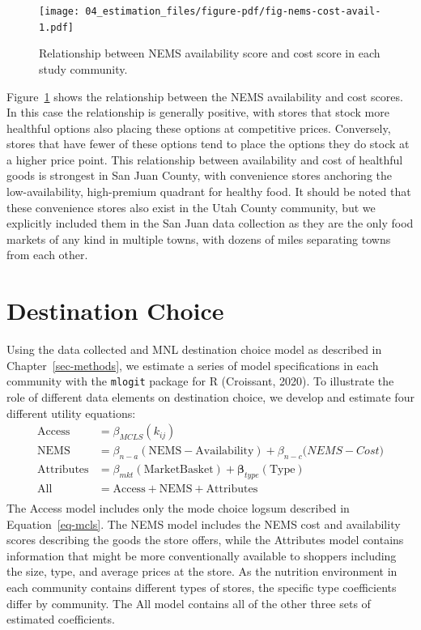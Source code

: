 \documentclass[
  letterpaper,
  DIV=11,
  numbers=noendperiod]{scrreport}
\begin{document}
\begin{figure}[t]

{\centering \texttt{[image: 04\_estimation\_files/figure-pdf/fig-nems-cost-avail-1.pdf]}

}

\caption{\label{fig-nems-cost-avail}Relationship between NEMS
availability score and cost score in each study community.}

\end{figure}

Figure~\ref{fig-nems-cost-avail} shows the relationship between the NEMS
availability and cost scores. In this case the relationship is generally
positive, with stores that stock more healthful options also placing
these options at competitive prices. Conversely, stores that have fewer
of these options tend to place the options they do stock at a higher
price point. This relationship between availability and cost of
healthful goods is strongest in San Juan County, with convenience stores
anchoring the low-availability, high-premium quadrant for healthy food.
It should be noted that these convenience stores also exist in the Utah
County community, but we explicitly included them in the San Juan data
collection as they are the only food markets of any kind in multiple
towns, with dozens of miles separating towns from each other.

\hypertarget{sec-estimation}{%
\section{Destination Choice}\label{sec-estimation}}

Using the data collected and MNL destination choice model as described
in Chapter~\ref{sec-methods}, we estimate a series of model
specifications in each community with the \texttt{mlogit} package for R
(Croissant, 2020). To illustrate the role of different data elements on
destination choice, we develop and estimate four different utility
equations: \begin{align*}
\mathrm{Access} &= \beta_{MCLS}( k_{ij})\\
\mathrm{NEMS} &= \beta_{n-a} (\mathrm{NEMS-Availability}) + \beta_{n-c}\mathrm({NEMS-Cost})\\
\mathrm{Attributes} &= \beta_{mkt} (\mathrm{Market Basket}) + \mathbf{\beta}_{type}(\mathrm{Type})\\
\mathrm{All} &= \mathrm{Access} + \mathrm{NEMS} + \mathrm{Attributes}\\
\end{align*} The Access model includes only the mode choice logsum
described in Equation~\ref{eq-mcls}. The NEMS model includes the NEMS
cost and availability scores describing the goods the store offers,
while the Attributes model contains information that might be more
conventionally available to shoppers including the size, type, and
average prices at the store. As the nutrition environment in each
community contains different types of stores, the specific type
coefficients differ by community. The All model contains all of the
other three sets of estimated coefficients.
\end{document}
